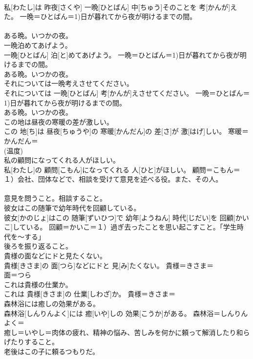 \documentclass[8pt]{extreport}
\begin{document}
\begin{CJK}{UTF8}{min}
{\\	私[わたし]は 昨夜[さくや] 一晩[ひとばん] 中[ちゅう]そのことを 考[かんが]えた。	一晩＝ひとばん＝1)日が暮れてから夜が明けるまでの間。 　　　　　　　　
\\	ある晩。いつかの夜。
\\	一晩泊めてあげよう。	
\\	一晩[ひとばん] 泊[と]めてあげよう。	一晩＝ひとばん＝1)日が暮れてから夜が明けるまでの間。 　　　　　　　　
\\	ある晩。いつかの夜。
\\	それについては一晩考えさせてください。	
\\	それについては 一晩[ひとばん] 考[かんが]えさせてください。	一晩＝ひとばん＝1)日が暮れてから夜が明けるまでの間。 　　　　　　　　
\\	ある晩。いつかの夜。
\\	この地は昼夜の寒暖の差が激しい。	
\\	この 地[ち]は 昼夜[ちゅうや]の 寒暖[かんだん]の 差[さ]が 激[はげ]しい。	寒暖＝かんだん＝ 
\\	(温度) 
\\	私の顧問になってくれる人がほしい。	
\\	私[わたし]の 顧問[こもん]になってくれる 人[ひと]がほしい。	顧問＝こもん＝１）会社、団体などで、相談を受けて意見を述べる役。また、その人。 　　　　　　　
\\	意見を問うこと。相談すること。
\\	彼女はこの随筆で幼年時代を回顧している。	
\\	彼女[かのじょ]はこの 随筆[ずいひつ]で 幼年[ようねん] 時代[じだい]を 回顧[かいこ]している。	回顧＝かいこ＝１）過ぎ去ったことを思い起こすこと。「学生時代を〜する」 　　　　　　　
\\	後ろを振り返ること。
\\	貴様の面などにドと見たくない。	
\\	貴様[きさま]の 面[つら]などにドと 見[み]たくない。	貴様＝きさま＝ 
\\	面＝つら
\\	これは貴様の仕業か。	
\\	これは 貴様[きさま]の 仕業[しわざ]か。	貴様＝きさま＝ 
\\	森林浴には癒しの効果がある。	
\\	森林浴[しんりんよく]には 癒[いや]しの 効果[こうか]がある。	森林浴＝しんりんよく＝ 
\\	癒し＝いやし＝肉体の疲れ、精神の悩み、苦しみを何かに頼って解消したり和らげたりすること。
\\	老後はこの子に頼るつもりだ。	
}
\end{CJK}
\end{document}
